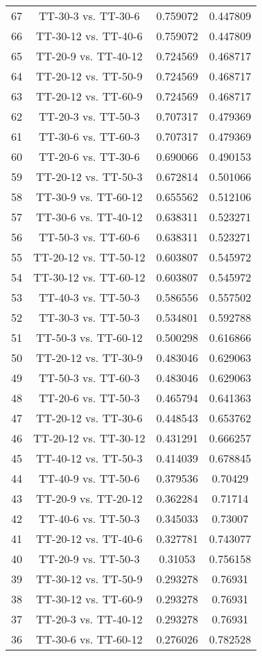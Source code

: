 \documentclass[a4paper,10pt]{article}
\begin{document}
\begin{landscape}
\begin{table}[!htp]
\begin{tabular}{cccc}
67&TT-30-3 vs. TT-30-6&0.759072&0.447809\\
66&TT-30-12 vs. TT-40-6&0.759072&0.447809\\
65&TT-20-9 vs. TT-40-12&0.724569&0.468717\\
64&TT-20-12 vs. TT-50-9&0.724569&0.468717\\
63&TT-20-12 vs. TT-60-9&0.724569&0.468717\\
62&TT-20-3 vs. TT-50-3&0.707317&0.479369\\
61&TT-30-6 vs. TT-60-3&0.707317&0.479369\\
60&TT-20-6 vs. TT-30-6&0.690066&0.490153\\
59&TT-20-12 vs. TT-50-3&0.672814&0.501066\\
58&TT-30-9 vs. TT-60-12&0.655562&0.512106\\
57&TT-30-6 vs. TT-40-12&0.638311&0.523271\\
56&TT-50-3 vs. TT-60-6&0.638311&0.523271\\
55&TT-20-12 vs. TT-50-12&0.603807&0.545972\\
54&TT-30-12 vs. TT-60-12&0.603807&0.545972\\
53&TT-40-3 vs. TT-50-3&0.586556&0.557502\\
52&TT-30-3 vs. TT-50-3&0.534801&0.592788\\
51&TT-50-3 vs. TT-60-12&0.500298&0.616866\\
50&TT-20-12 vs. TT-30-9&0.483046&0.629063\\
49&TT-50-3 vs. TT-60-3&0.483046&0.629063\\
48&TT-20-6 vs. TT-50-3&0.465794&0.641363\\
47&TT-20-12 vs. TT-30-6&0.448543&0.653762\\
46&TT-20-12 vs. TT-30-12&0.431291&0.666257\\
45&TT-40-12 vs. TT-50-3&0.414039&0.678845\\
44&TT-40-9 vs. TT-50-6&0.379536&0.70429\\
43&TT-20-9 vs. TT-20-12&0.362284&0.71714\\
42&TT-40-6 vs. TT-50-3&0.345033&0.73007\\
41&TT-20-12 vs. TT-40-6&0.327781&0.743077\\
40&TT-20-9 vs. TT-50-3&0.31053&0.756158\\
39&TT-30-12 vs. TT-50-9&0.293278&0.76931\\
38&TT-30-12 vs. TT-60-9&0.293278&0.76931\\
37&TT-20-3 vs. TT-40-12&0.293278&0.76931\\
36&TT-30-6 vs. TT-60-12&0.276026&0.782528\\

\end{tabular}
\end{table}
\end{landscape}
\end{document}
